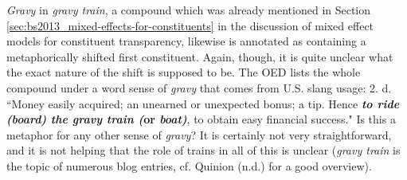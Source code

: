 \emph{Gravy} in \emph{gravy train}, a compound which was already mentioned in
 Section \ref{sec:bs2013_mixed-effects-for-constituents} in the
 discussion of mixed
 effect models for constituent transparency, likewise is annotated as
 containing a metaphorically shifted first constituent. Again, though, it is
 quite unclear what the exact nature of the shift is supposed to
 be. The OED lists the whole compound under a word sense of
 \emph{gravy} that comes from U.S. slang usage:
 2. d. ``Money easily acquired; an
 unearned or unexpected bonus; a tip. Hence \textbf{\emph{to ride (board) the gravy
 train (}or \emph{boat)}}, to obtain easy financial success."
Is this a metaphor for any other sense of \emph{gravy}? It is
certainly not very straightforward, and it is not helping that the
role of trains in all of this is unclear (\emph{gravy train} is the
topic of numerous blog entries, cf. Quinion (n.d.) for a good overview).\nocite{Quinion:web}

